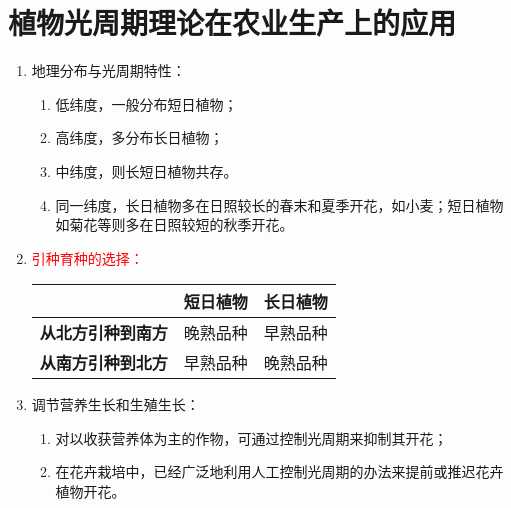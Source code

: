 \section{植物光周期理论在农业生产上的应用}
\begin{enumerate}
    \item 地理分布与光周期特性：
    \begin{enumerate}
        \item 低纬度，一般分布短日植物；
        \item 高纬度，多分布长日植物；
        \item 中纬度，则长短日植物共存。
        \item 同一纬度，长日植物多在日照较长的春末和夏季开花，如小麦；短日植物如菊花等则多在日照较短的秋季开花。
    \end{enumerate}
    \item \textcolor{red}{引种育种的选择：}
    \begin{table}[h]
        \centering
        \begin{tabular}{ccc}
            \toprule
            &\textbf{短日植物}&\textbf{长日植物}\\
            \midrule
            \textbf{从北方引种到南方}&晚熟品种&早熟品种\\
            \textbf{从南方引种到北方}&早熟品种&晚熟品种\\
            \bottomrule
        \end{tabular}
    \end{table}
    \item 调节营养生长和生殖生长：
    \begin{enumerate}
        \item 对以收获营养体为主的作物，可通过控制光周期来抑制其开花；
        \item 在花卉栽培中，已经广泛地利用人工控制光周期的办法来提前或推迟花卉植物开花。
    \end{enumerate}
\end{enumerate}